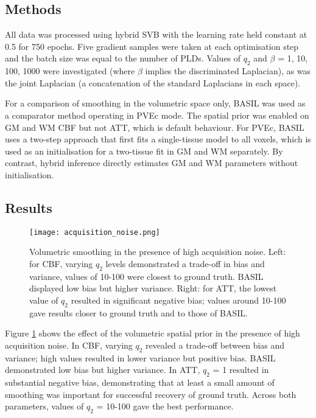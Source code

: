 \subsection{Methods}

All data was processed using hybrid SVB with the learning rate held constant at 0.5 for 750 epochs. Five gradient samples were taken at each optimisation step and the batch size was equal to the number of PLDs. Values of $q_2$ and $\beta$ = 1, 10, 100, 1000 were investigated (where $\beta$ implies the discriminated Laplacian), as was the joint Laplacian (a concatenation of the standard Laplacians in each space). 

For a comparison of smoothing in the volumetric space only, BASIL was used as a comparator method operating in PVEc mode. The spatial prior was enabled on GM and WM CBF but not ATT, which is default behaviour. For PVEc, BASIL uses a two-step approach that first fits a single-tissue model to all voxels, which is used as an initialisation for a two-tissue fit in GM and WM separately. By contrast, hybrid inference directly estimates GM and WM parameters without initialisation. 

\subsection{Results}

\begin{figure}[H]
\centering
\texttt{[image: acquisition\_noise.png]}
\caption{Volumetric smoothing in the presence of high acquisition noise. Left: for CBF, varying $q_2$ levels demonstrated a trade-off in bias and variance, values of 10-100 were closest to ground truth. BASIL displayed low bias but higher variance. Right: for ATT, the lowest value of $q_2$ resulted in significant negative bias; values around 10-100 gave results closer to ground truth and to those of BASIL.}
\label{acquisition_noise} 
\end{figure}

Figure \ref{acquisition_noise} shows the effect of the volumetric spatial prior in the presence of high acquisition noise. In CBF, varying $q_2$ revealed a trade-off between bias and variance; high values resulted in lower variance but positive bias. BASIL demonstrated low bias but higher variance. In ATT, $q_2$ = 1 resulted in substantial negative bias, demonstrating that at least a small amount of smoothing was important for successful recovery of ground truth. Across both parameters, values of $q_2$ = 10-100 gave the best performance. 


